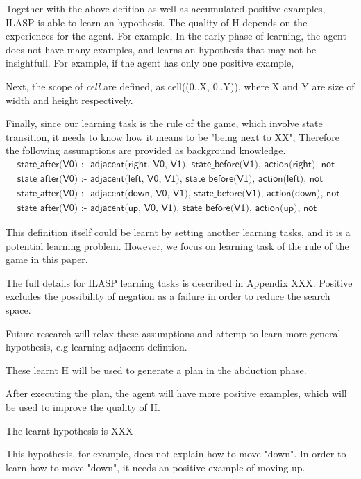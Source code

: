 Together with the above defition as well as accumulated positive examples, ILASP is able to learn an hypothesis. The quality of H depends on the experiences for the agent.
For example, In the early phase of learning, the agent does not have many examples, and learns an hypothesis that may not be insightfull.
For example, if the agent has only one positive example,

Next, the scope of \textit{cell} are defined, as cell((0..X, 0..Y)), where X and Y are size of width and height respectively.

Finally, since our learning task is the rule of the game, which involve state transition, it needs to know how it means to be "being next to XX",
Therefore the following assumptions are provided as background knowledge.
\begin{equation}
\begin{split}
&\textsf{state\_after(V0) :- adjacent(right, V0, V1), state\_before(V1), action(right), not wall(V0).}\\
&\textsf{state\_after(V0) :- adjacent(left, V0, V1), state\_before(V1), action(left), not wall(V0).}\\
&\textsf{state\_after(V0) :- adjacent(down, V0, V1), state\_before(V1), action(down), not wall(V0).}\\
&\textsf{state\_after(V0) :- adjacent(up, V0, V1), state\_before(V1), action(up), not wall(V0).}
\end{split}
\end{equation}

This definition itself could be learnt by setting another learning tasks, and it is a potential learning problem.
However, we focus on learning task of the rule of the game in this paper.

The full details for ILASP learning tasks is described in Appendix XXX.
Positive excludes the possibility of negation as a failure in order to reduce the search space.

Future research will relax these assumptions and attemp to learn more general hypothesis,
e.g learning adjacent defintion.

These learnt H will be used to generate a plan in the abduction phase.

After executing the plan, the agent will have more positive examples, which will be used to improve the quality of H.

The learnt hypothesis is XXX

This hypothesis, for example, does not explain how to move "down". In order to learn how to move "down", it needs an positive example of moving up.

